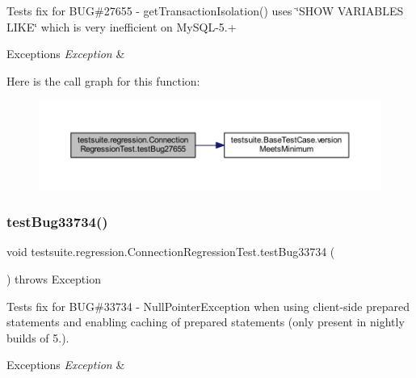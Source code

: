 Tests fix for B\+UG\#27655 -\/ get\+Transaction\+Isolation() uses \char`\"{}\+S\+H\+O\+W V\+A\+R\+I\+A\+B\+L\+E\+S L\+I\+K\+E\char`\"{} which is very inefficient on My\+S\+Q\+L-\/5.+


\begin{DoxyExceptions}{Exceptions}
{\em Exception} & \\
\hline
\end{DoxyExceptions}
Here is the call graph for this function\+:
\nopagebreak
\begin{figure}[H]
\begin{center}
\leavevmode
\includegraphics[width=350pt]{classtestsuite_1_1regression_1_1_connection_regression_test_a02d58a66068ff4c5f9fa6c77ebf3b50f_cgraph}
\end{center}
\end{figure}
\mbox{\label{classtestsuite_1_1regression_1_1_connection_regression_test_a06827fd6f7095ca49c066279b2dd41a6}} 
\subsubsection{\texorpdfstring{test\+Bug33734()}{testBug33734()}}
{\footnotesize\ttfamily void testsuite.\+regression.\+Connection\+Regression\+Test.\+test\+Bug33734 (\begin{DoxyParamCaption}{ }\end{DoxyParamCaption}) throws Exception}

Tests fix for B\+UG\#33734 -\/ Null\+Pointer\+Exception when using client-\/side prepared statements and enabling caching of prepared statements (only present in nightly builds of 5.).


\begin{DoxyExceptions}{Exceptions}
{\em Exception} & \\
\hline
\end{DoxyExceptions}
\mbox{\label{classtestsuite_1_1regression_1_1_connection_regression_test_ab8a5be5d0f3c870006614f5aa94dd750}} 
